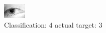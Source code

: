 \begin{figure}[h!]
\begin{center}
\includegraphics[width=0.60\columnwidth]{figures/ID1349_class_4_target_3.png}
\end{center}
\caption{ Classification: 4 actual target: 3}
\label{fig:ID1349_class_4_target_3}
\end{figure}
